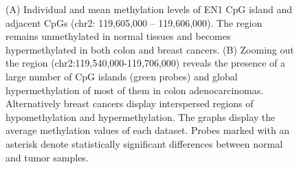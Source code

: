 \documentclass{bmcart}
\begin{document}
\begin{backmatter}
\begin{figure}[h!]
  \caption{
(A) Individual and mean methylation levels of EN1 CpG island and adjacent CpGs (chr2: 119,605,000 – 119,606,000). The region remains unmethylated in normal tissues and becomes hypermethylated in both colon and breast cancers. (B) Zooming out the region (chr2:119,540,000-119,706,000) reveals the presence of a large number of CpG islands (green probes) and global hypermethylation of most of them in colon adenocarcinomas. Alternatively breast cancers display interspersed regions of hypomethylation and hypermethylation. The graphs display the average methylation values of each dataset. Probes marked with an asterisk denote statistically significant differences between normal and tumor samples. 
}
  \label{fig:4}
\end{figure}









\end{backmatter}
\end{document}
